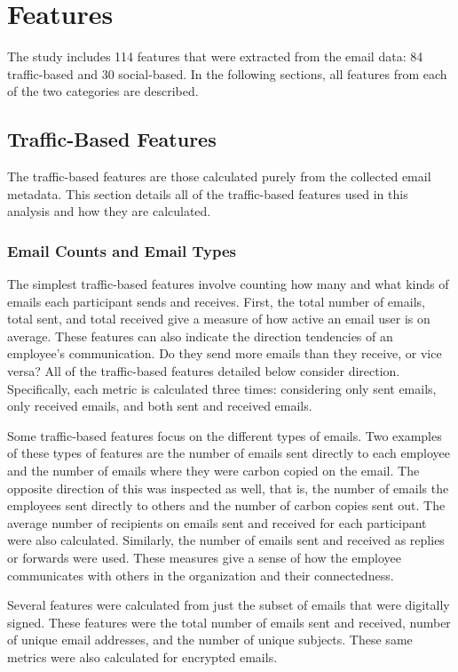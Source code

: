 \documentclass[12pt]{report}
\begin{document}
\section{Features}
The study includes 114 features that were extracted from the email data: 84 traffic-based and 30 social-based.
In the following sections, all features from each of the two categories are described. 

\subsection{Traffic-Based Features}
The traffic-based features are those calculated purely from the collected email metadata.
This section details all of the traffic-based features used in this analysis and how they are calculated. 

\subsubsection{Email Counts and Email Types}
The simplest traffic-based features involve counting how many and what kinds of emails each participant sends and receives.
First, the total number of emails, total sent, and total received give a measure of how active an email user is on average.
These features can also indicate the direction tendencies of an employee's communication. 
Do they send more emails than they receive, or vice versa?  All of the traffic-based features detailed below consider direction.
Specifically, each metric is calculated three times: considering only sent emails, only received emails, and both sent and received emails.

Some traffic-based features focus on the different types of emails.
Two examples of these types of features are the number of emails sent directly to each employee and the number of emails where they were carbon copied on the email.
The opposite direction of this was inspected as well, that is, the number of emails the employees sent directly to others and the number of carbon copies sent out.
The average number of recipients on emails sent and received for each participant were also calculated.
Similarly, the number of emails sent and received as replies or forwards were used.
These measures give a sense of how the employee communicates with others in the organization and their connectedness.

Several features were calculated from just the subset of emails that were digitally signed.  These features were the total number of emails sent and received, number of unique email addresses, and the number of unique subjects.
These same metrics were also calculated for encrypted emails.
\end{document}
